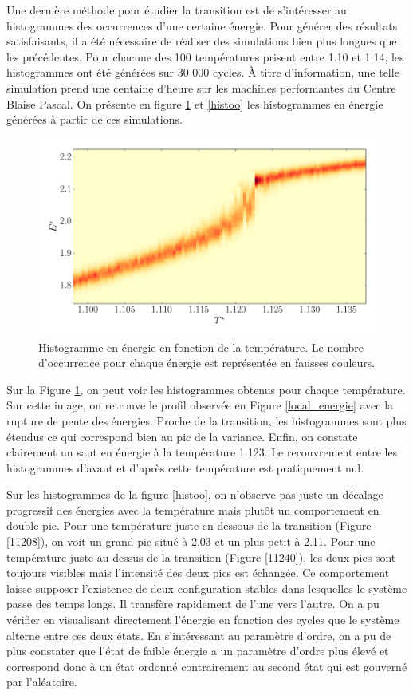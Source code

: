 \documentclass[11pt,a4paper]{article}
\numberwithin{equation}{section}
\begin{document}
Une dernière méthode pour étudier la transition est de s'intéresser au histogrammes des occurrences d'une certaine énergie. Pour générer des résultats satisfaisants, il a été nécessaire de réaliser des simulations bien plus longues que les précédentes. Pour chacune des 100 températures prisent entre 1.10 et 1.14, les histogrammes ont été générées sur 30 000 cycles. À titre d'information, une telle simulation prend une centaine d'heure sur les machines performantes du Centre Blaise Pascal. On présente en figure \ref{imagehisto} et \ref{histoo} les histogrammes en énergie générées à partir de ces simulations.

\begin{figure}[h!]
    \centering	    
	\includegraphics[scale=0.5]{figures/histo_image.pdf}
    \caption{Histogramme en énergie en fonction de la température. Le nombre d’occurrence pour chaque énergie est représentée en fausses couleurs.}
    	\label{imagehisto} 
\end{figure}
Sur la Figure \ref{imagehisto}, on peut voir les histogrammes obtenus pour chaque température. Sur cette image, on retrouve le profil observée en Figure \ref{local_energie} avec la rupture de pente des énergies. Proche de la transition, les histogrammes sont plus étendus ce qui correspond bien au pic de la variance. Enfin, on constate clairement un saut en énergie à la température 1.123. Le recouvrement entre les histogrammes d'avant et d'après cette température est pratiquement nul.
\medskip

Sur les histogrammes de la figure \ref{histoo}, on n'observe pas juste un décalage progressif des énergies avec la température mais plutôt un comportement en double pic. Pour une température juste en dessous de la transition (Figure \ref{11208}), on voit un grand pic situé à 2.03 et un plus petit à 2.11. Pour une température juste au dessus de la transition (Figure \ref{11240}), les deux pics sont toujours visibles mais l'intensité des deux pics est échangée. Ce comportement laisse supposer l'existence de deux configuration stables dans lesquelles le système passe des temps longs. Il transfère rapidement de l'une vers l'autre. On a pu vérifier en visualisant directement l'énergie en fonction des cycles que le système alterne entre ces deux états. En s'intéressant au paramètre d'ordre, on a pu de plus constater que l'état de faible énergie a un paramètre d'ordre plus élevé et correspond donc à un état ordonné contrairement au second état qui est gouverné par l'aléatoire.
\medskip
\end{document}
